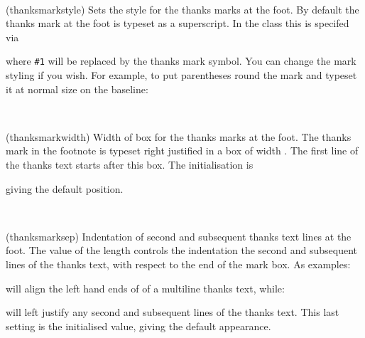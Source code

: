 \begin{syntax}
\cmd{\thanksmarkstyle} \\
\end{syntax}
\glossary(thanksmarkstyle)%
  {}%
  {Sets the style for the thanks marks at the foot.}
By default the thanks mark at the foot is typeset as a superscript. In
the class this is specifed via
\begin{lcode}
\end{lcode}
where \verb?#1? will be replaced by the thanks mark symbol. You can change
the mark styling
if you wish. For example, to put parentheses round the
mark and typeset it at normal size on the baseline:
\begin{lcode}
\end{lcode}


\begin{syntax}
\lnc{\thanksmarkwidth} \\
\end{syntax}
\glossary(thanksmarkwidth)%
  {}%
  {Width of box for the thanks marks at the foot.}
 The thanks mark in the footnote is typeset right justified in a box
of width \lnc{\thanksmarkwidth}. The first line of the thanks text starts
after this box. The initialisation is 
\begin{lcode}
\setlength{\thanksmarkwidth}{1.8em}
\end{lcode}
giving the default position.

\begin{syntax}
\lnc{\thanksmarksep} \\
\end{syntax}
\glossary(thanksmarksep)%
  {}%
  {Indentation of second and subsequent thanks text lines at the foot.}
The value of the length
 \lnc{\thanksmarksep} controls the indentation the
second and subsequent lines of the thanks text, with respect to
the end of the mark box. As examples: 
\begin{lcode}
\setlength{\thanksmarksep}{0em}
\end{lcode}
 will align the left hand ends of of a multiline thanks text, while: 
\begin{lcode}
\setlength{\thanksmarksep}{-\thanksmarkwidth}
\end{lcode}
will left justify any second and subsequent lines of the thanks text. 
This last
setting is the initialised value, giving the default appearance.


